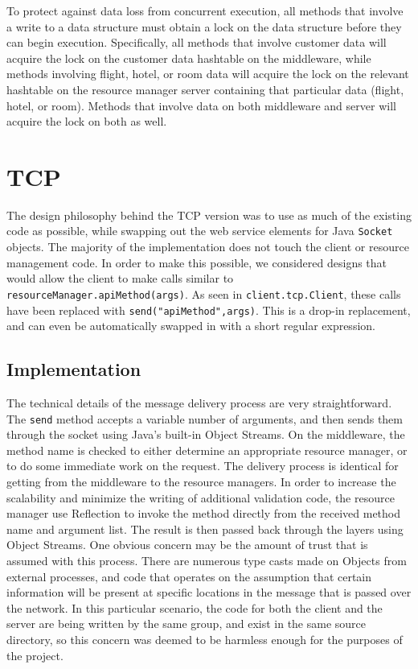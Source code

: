 \documentclass[11pt]{article}
\begin{document}
To protect against data loss from concurrent execution, all methods that involve a write to a data structure must obtain a lock on the data structure before they can begin execution. Specifically, all methods that involve customer data will acquire the lock on the customer data hashtable on the middleware, while methods involving flight, hotel, or room data will acquire the lock on the relevant hashtable on the resource manager server containing that particular data (flight, hotel, or room). Methods that involve data on both middleware and server will acquire the lock on both as well. \par

\section*{TCP}

The design philosophy behind the TCP version was to use as much of the existing code as possible, while swapping out the web service elements for Java \texttt{Socket} objects. The majority of the implementation does not touch the client or resource management code. In order to make this possible, we considered designs that would allow the client to make calls similar to \texttt{resourceManager.apiMethod(args)}. As seen in \texttt{client.tcp.Client}, these calls have been replaced with \texttt{send("apiMethod",args)}. This is a drop-in replacement, and can even be automatically swapped in with a short regular expression. \par 

\subsection*{Implementation} 

The technical details of the message delivery process are very straightforward. The \texttt{send} method accepts a variable number of arguments, and then sends them through the socket using Java's built-in Object Streams. On the middleware, the method name is checked to either determine an appropriate resource manager, or to do some immediate work on the request. The delivery process is identical for getting from the middleware to the resource managers. In order to increase the scalability and minimize the writing of additional validation code, the resource manager use Reflection to invoke the method directly from the received method name and argument list. The result is then passed back through the layers using Object Streams. One obvious concern may be the amount of trust that is assumed with this process. There are numerous type casts made on Objects from external processes, and code that operates on the assumption that certain information will be present at specific locations in the message that is passed over the network. In this particular scenario, the code for both the client and the server are being written by the same group, and exist in the same source directory, so this concern was deemed to be harmless enough for the purposes of the project. \par
\end{document}
